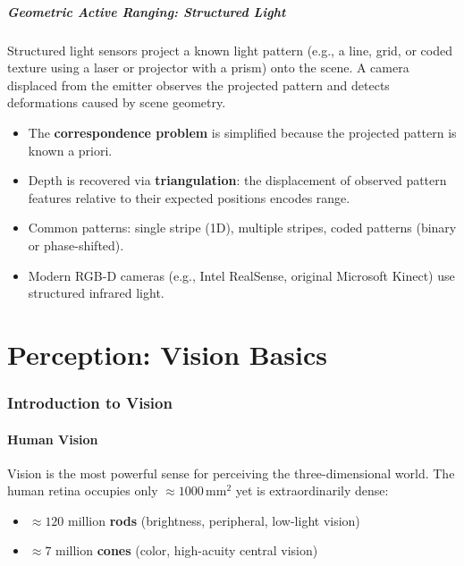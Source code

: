 \documentclass[11pt,a4paper]{article}
\theoremstyle{definition}
\theoremstyle{plain}
\theoremstyle{remark}
\begin{document}
\subsubsection*{Geometric Active Ranging: Structured Light}

Structured light sensors project a known light pattern (e.g., a line, grid, or coded texture using a laser or projector with a prism) onto the scene. A camera displaced from the emitter observes the projected pattern and detects deformations caused by scene geometry.

\begin{itemize}
    \item The \textbf{correspondence problem} is simplified because the projected pattern is known a priori.
    \item Depth is recovered via \textbf{triangulation}: the displacement of observed pattern features relative to their expected positions encodes range.
    \item Common patterns: single stripe (1D), multiple stripes, coded patterns (binary or phase-shifted).
    \item Modern RGB-D cameras (e.g., Intel RealSense, original Microsoft Kinect) use structured infrared light.
\end{itemize}



\part{Perception: Vision Basics}

\section{Introduction to Vision}

\subsection{Human Vision}

Vision is the most powerful sense for perceiving the three-dimensional world. The human retina occupies only $\approx 1000\,\text{mm}^2$ yet is extraordinarily dense:

\begin{itemize}
    \item $\approx 120$ million \textbf{rods} (brightness, peripheral, low-light vision)
    \item $\approx 7$ million \textbf{cones} (color, high-acuity central vision)
\end{itemize}
\end{document}
